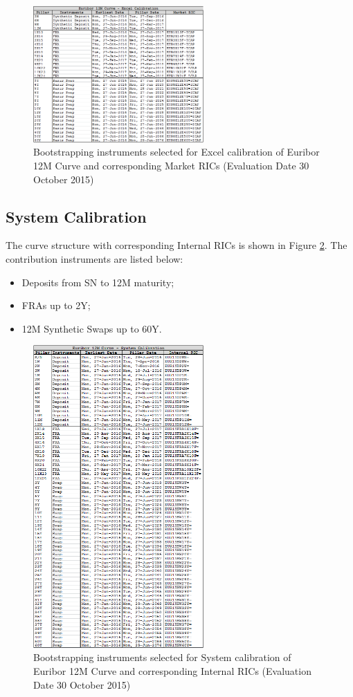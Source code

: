 \begin{figure}
\centering
\includegraphics[width=0.58\textwidth]{images/12MExcel.png}
\caption{Bootstrapping instruments selected for Excel calibration of Euribor 12M Curve and corresponding Market RICs (Evaluation Date 30 October 2015)}
\label{fig:12MExcel}
\end{figure}

\subsection{System Calibration}

The curve structure with corresponding Internal RICs is shown in Figure \ref{fig:12MMx}. The contribution instruments are listed below:
\begin{itemize}
\item Deposits from SN to 12M maturity; 
\item FRAs up to 2Y;
\item 12M Synthetic Swaps up to 60Y.
\end{itemize}

\begin{figure}
\centering
\includegraphics[width=0.58\textwidth]{images/12MMx.png}
\caption{Bootstrapping instruments selected for System calibration of Euribor 12M Curve and corresponding Internal RICs (Evaluation Date 30 October 2015)}
\label{fig:12MMx}
\end{figure}
